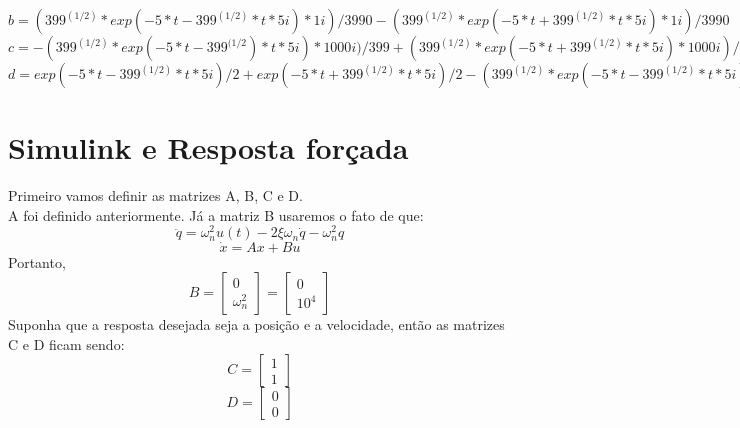 \documentclass[a4paper, 12pt]{article}
\begin{document}
		$b = (399^{(1/2)}*exp(- 5*t - 399^{(1/2)}*t*5i)*1i)/3990 - (399^{(1/2)}*exp(- 5*t + 399^{(1/2)}*t*5i)*1i)/3990$\\
		
		$c = -(399^{(1/2)}*exp(- 5*t - 399^{(1/2})*t*5i)*1000i)/399 + (399^{(1/2)}*exp(- 5*t + 399^{(1/2)}*t*5i)*1000i)/399$	\\
		
		$d = exp(- 5*t - 399^{(1/2)}*t*5i)/2 + exp(- 5*t + 399^{(1/2)}*t*5i)/2 - (399^{(1/2)}*exp(- 5*t - 399^{(1/2)}*t*5i)*1i)/798 + (399^{(1/2)}*exp(- 5*t + 399^{(1/2)}*t*5i)*1i)/798$

\newpage
\section{Simulink e Resposta forçada}
	Primeiro vamos definir as matrizes A, B, C e D. \\
	A foi definido anteriormente.
	Já a matriz B usaremos o fato de que:
	\begin{equation}
		\ddot{q}= \omega_n^2u(t) - 2\xi \omega_n \dot{q} - \omega_n^2q 
	\end{equation}
	\begin{equation}
		\dot{x} = Ax + Bu
	\end{equation}
	Portanto, 
	\begin{equation}
		B = \begin{bmatrix}
			0\\
			\omega_n^2			
		\end{bmatrix} = \begin{bmatrix}
			0\\
			10^4
		\end{bmatrix}
	\end{equation}
	Suponha que a resposta desejada seja a posição e a velocidade, então as matrizes C e D ficam sendo:
	\begin{equation}
		C = \begin{bmatrix}
			1\\
			1
		\end{bmatrix}
	\end{equation}
	\begin{equation}
		D = \begin{bmatrix}
			0\\
			0 
		\end{bmatrix}
	\end{equation}
\end{document}
